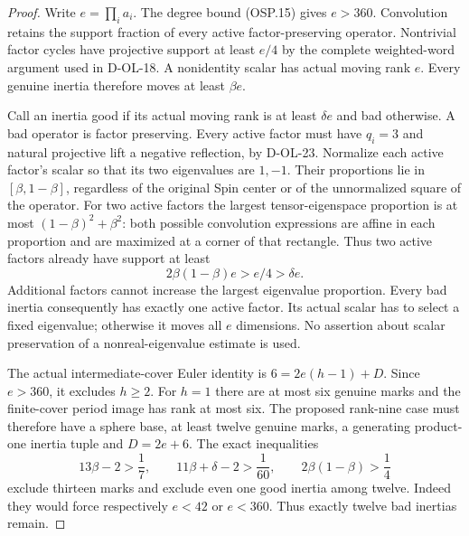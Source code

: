 \begin{proof}
Write $e=\prod_i a_i$.  The degree bound (OSP.15)
gives $e>360$.  Convolution retains the support fraction
of every active factor-preserving operator.
Nontrivial factor cycles have projective support at least
$e/4$ by the complete weighted-word argument used in
D-OL-18.  A nonidentity scalar has actual moving rank $e$.
Every genuine inertia therefore moves at least $\beta e$.

Call an inertia good if its actual moving rank is at
least $\delta e$ and bad otherwise.  A bad operator is
factor preserving.  Every active factor must have $q_i=3$
and natural projective lift a negative reflection, by
D-OL-23.  Normalize each active factor's scalar so that
its two eigenvalues are $1,-1$.  Their proportions lie
in $[\beta,1-\beta]$, regardless of the original Spin
center or of the unnormalized square of the operator.
For two active factors the largest tensor-eigenspace
proportion is at most $(1-\beta)^2+\beta^2$:
both possible convolution expressions are affine in each
proportion and are maximized at a corner of that rectangle.
Thus two active factors already have support at least
\[
                   2\beta(1-\beta)e>e/4>\delta e.            \tag{OSP.19}
\]
Additional factors cannot increase the largest
eigenvalue proportion.  Every bad inertia consequently
has exactly one active factor.  Its actual scalar has to
select a fixed eigenvalue; otherwise it moves all $e$
dimensions.  No assertion about scalar preservation of
a nonreal-eigenvalue estimate is used.

The actual intermediate-cover Euler identity is
$6=2e(h-1)+D$.  Since $e>360$, it excludes $h\ge2$.
For $h=1$ there are at most six genuine marks and the
finite-cover period image has rank at most six.
The proposed rank-nine case must therefore have a sphere
base, at least twelve genuine marks, a generating
product-one inertia tuple and $D=2e+6$.
The exact inequalities
\[
 13\beta-2>\frac17,\qquad
 11\beta+\delta-2>\frac1{60},\qquad
 2\beta(1-\beta)>\frac14                                  \tag{OSP.20}
\]
exclude thirteen marks and exclude even one good inertia
among twelve.  Indeed they would force respectively
$e<42$ or $e<360$.  Thus exactly twelve bad inertias remain.


\end{proof}
